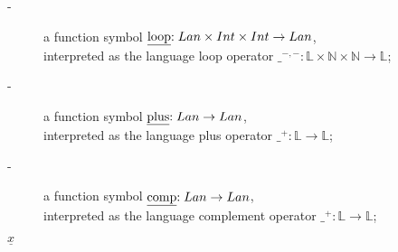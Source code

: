\begin{description}
	\item[-] a function symbol \($\underline{loop}$ : Lan \times Int \times Int \to Lan\),\\ interpreted as the language loop operator \(  \_^{-,-} : \mathbb L \times \mathbb N \times \mathbb N \to \mathbb L\);
	
	\item[-] a function symbol \($\underline{plus}$ : Lan \to Lan\),\\ interpreted as the language plus operator \( \_^+ : \mathbb L \to \mathbb L\);
	\item[-] a function symbol \($\underline{comp}$ : Lan \to Lan\),\\ interpreted as the language complement operator \( \_^+ : \mathbb L \to \mathbb L\);
\end{description}


$\underline{x}$
